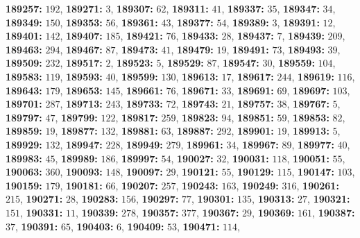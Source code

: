 \textsf{\bfseries 189257:} $192$, \textsf{\bfseries 189271:} $3$, \textsf{\bfseries 189307:} $62$, \textsf{\bfseries 189311:} $41$, \textsf{\bfseries 189337:} $35$, \textsf{\bfseries 189347:} $34$, \textsf{\bfseries 189349:} $150$, \textsf{\bfseries 189353:} $56$, \textsf{\bfseries 189361:} $43$, \textsf{\bfseries 189377:} $54$, \textsf{\bfseries 189389:} $3$, \textsf{\bfseries 189391:} $12$, \textsf{\bfseries 189401:} $142$, \textsf{\bfseries 189407:} $185$, \textsf{\bfseries 189421:} $76$, \textsf{\bfseries 189433:} $28$, \textsf{\bfseries 189437:} $7$, \textsf{\bfseries 189439:} $209$, \textsf{\bfseries 189463:} $294$, \textsf{\bfseries 189467:} $87$, \textsf{\bfseries 189473:} $41$, \textsf{\bfseries 189479:} $19$, \textsf{\bfseries 189491:} $73$, \textsf{\bfseries 189493:} $39$, \textsf{\bfseries 189509:} $232$, \textsf{\bfseries 189517:} $2$, \textsf{\bfseries 189523:} $5$, \textsf{\bfseries 189529:} $87$, \textsf{\bfseries 189547:} $30$, \textsf{\bfseries 189559:} $104$, \textsf{\bfseries 189583:} $119$, \textsf{\bfseries 189593:} $40$, \textsf{\bfseries 189599:} $130$, \textsf{\bfseries 189613:} $17$, \textsf{\bfseries 189617:} $244$, \textsf{\bfseries 189619:} $116$, \textsf{\bfseries 189643:} $179$, \textsf{\bfseries 189653:} $145$, \textsf{\bfseries 189661:} $76$, \textsf{\bfseries 189671:} $33$, \textsf{\bfseries 189691:} $69$, \textsf{\bfseries 189697:} $103$, \textsf{\bfseries 189701:} $287$, \textsf{\bfseries 189713:} $243$, \textsf{\bfseries 189733:} $72$, \textsf{\bfseries 189743:} $21$, \textsf{\bfseries 189757:} $38$, \textsf{\bfseries 189767:} $5$, \textsf{\bfseries 189797:} $47$, \textsf{\bfseries 189799:} $122$, \textsf{\bfseries 189817:} $259$, \textsf{\bfseries 189823:} $94$, \textsf{\bfseries 189851:} $59$, \textsf{\bfseries 189853:} $82$, \textsf{\bfseries 189859:} $19$, \textsf{\bfseries 189877:} $132$, \textsf{\bfseries 189881:} $63$, \textsf{\bfseries 189887:} $292$, \textsf{\bfseries 189901:} $19$, \textsf{\bfseries 189913:} $5$, \textsf{\bfseries 189929:} $132$, \textsf{\bfseries 189947:} $228$, \textsf{\bfseries 189949:} $279$, \textsf{\bfseries 189961:} $34$, \textsf{\bfseries 189967:} $89$, \textsf{\bfseries 189977:} $40$, \textsf{\bfseries 189983:} $45$, \textsf{\bfseries 189989:} $186$, \textsf{\bfseries 189997:} $54$, \textsf{\bfseries 190027:} $32$, \textsf{\bfseries 190031:} $118$, \textsf{\bfseries 190051:} $55$, \textsf{\bfseries 190063:} $360$, \textsf{\bfseries 190093:} $148$, \textsf{\bfseries 190097:} $29$, \textsf{\bfseries 190121:} $55$, \textsf{\bfseries 190129:} $115$, \textsf{\bfseries 190147:} $103$, \textsf{\bfseries 190159:} $179$, \textsf{\bfseries 190181:} $66$, \textsf{\bfseries 190207:} $257$, \textsf{\bfseries 190243:} $163$, \textsf{\bfseries 190249:} $316$, \textsf{\bfseries 190261:} $215$, \textsf{\bfseries 190271:} $28$, \textsf{\bfseries 190283:} $156$, \textsf{\bfseries 190297:} $77$, \textsf{\bfseries 190301:} $135$, \textsf{\bfseries 190313:} $27$, \textsf{\bfseries 190321:} $151$, \textsf{\bfseries 190331:} $11$, \textsf{\bfseries 190339:} $278$, \textsf{\bfseries 190357:} $377$, \textsf{\bfseries 190367:} $29$, \textsf{\bfseries 190369:} $161$, \textsf{\bfseries 190387:} $37$, \textsf{\bfseries 190391:} $65$, \textsf{\bfseries 190403:} $6$, \textsf{\bfseries 190409:} $53$, \textsf{\bfseries 190471:} $114$, 
